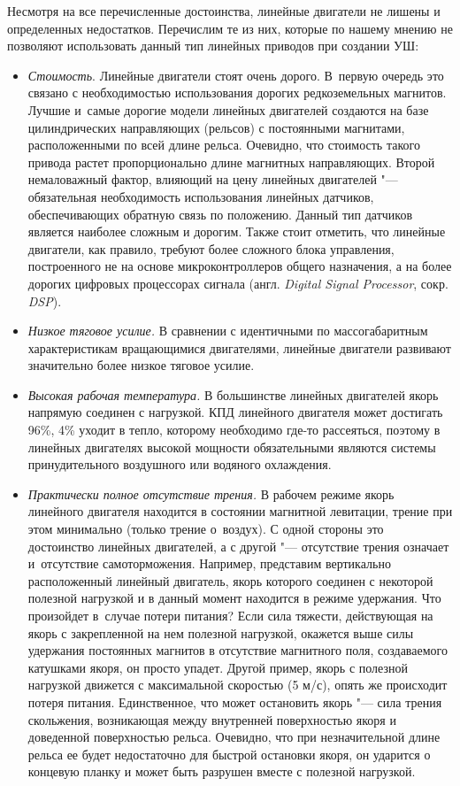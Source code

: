Несмотря на все перечисленные достоинства, линейные двигатели не лишены и определенных недостатков. Перечислим те из них, которые по нашему мнению не позволяют использовать данный тип линейных приводов при создании УШ:

\begin{itemize}
	\item \textit{Стоимость}. Линейные двигатели стоят очень дорого. В~первую очередь это связано с необходимостью использования дорогих редкоземельных магнитов. Лучшие и~самые дорогие модели линейных двигателей создаются на базе цилиндрических направляющих (рельсов) с постоянными магнитами, расположенными по всей длине рельса. Очевидно, что стоимость такого привода растет пропорционально длине магнитных направляющих. Второй немаловажный фактор, влияющий на цену линейных двигателей "--- обязательная необходимость использования линейных датчиков, обеспечивающих обратную связь по положению. Данный тип датчиков является наиболее сложным и дорогим. Также стоит отметить, что линейные двигатели, как правило, требуют более сложного блока управления, построенного не на основе микроконтроллеров общего назначения, а на более дорогих цифровых процессорах сигнала (англ. \textit{Digital Signal Processor}, сокр. \textit{DSP}).
	
	\item \textit{Низкое тяговое усилие.} В сравнении с идентичными по массогабаритным характеристикам вращающимися двигателями, линейные двигатели развивают значительно более низкое тяговое усилие.
	
	\item \textit{Высокая рабочая температура.} В большинстве линейных двигателей якорь напрямую соединен с нагрузкой. КПД линейного двигателя может достигать 96\%, 4\% уходит в тепло, которому необходимо где-то рассеяться, поэтому в линейных двигателях высокой мощности обязательными являются системы принудительного воздушного или водяного охлаждения.
	
	\item \textit{Практически полное отсутствие трения.} В рабочем режиме якорь линейного двигателя находится в состоянии магнитной левитации, трение при этом минимально (только трение о~воздух). С одной стороны это достоинство линейных двигателей, а с другой "--- отсутствие трения означает и~отсутствие самоторможения. Например, представим вертикально расположенный линейный двигатель, якорь которого соединен с некоторой полезной нагрузкой и в данный момент находится в режиме удержания. Что произойдет в~случае потери питания? Если сила тяжести, действующая на якорь с закрепленной на нем полезной нагрузкой, окажется выше силы удержания постоянных магнитов в отсутствие магнитного поля, создаваемого катушками якоря, он просто упадет. Другой пример, якорь с полезной нагрузкой движется с максимальной скоростью (5 м/с), опять же происходит потеря питания. Единственное, что может остановить якорь "--- сила трения скольжения, возникающая между внутренней поверхностью якоря и доведенной поверхностью рельса. Очевидно, что при незначительной длине рельса ее будет недостаточно для быстрой остановки якоря, он ударится о концевую планку и может быть разрушен вместе с полезной нагрузкой.
	

\end{itemize}
